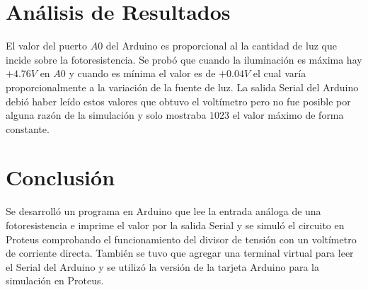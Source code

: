 \documentclass{article}
\begin{document}
\section{Análisis de Resultados}

El valor del puerto $A0$ del Arduino es proporcional al la cantidad de luz
que incide sobre la fotoresistencia. Se probó que cuando la iluminación es
máxima hay $+4.76V$ en $A0$ y cuando es mínima el valor es de $+0.04V$ el
cual varía proporcionalmente a la variación de la fuente de luz. La salida
Serial del Arduino debió haber leído estos valores que obtuvo el voltímetro
pero no fue posible por alguna razón de la simulación y solo mostraba $1023$
el valor máximo de forma constante.

\section{Conclusión}

Se desarrolló un programa en Arduino que lee la entrada análoga de una
fotoresistencia e imprime el valor por la salida Serial y se simuló el
circuito en Proteus comprobando el funcionamiento del divisor de tensión con
un voltímetro de corriente directa. También se tuvo que agregar una terminal
virtual para leer el Serial del Arduino y se utilizó la versión
 de la tarjeta Arduino para la simulación en Proteus.

\printbibliography
\end{document}
